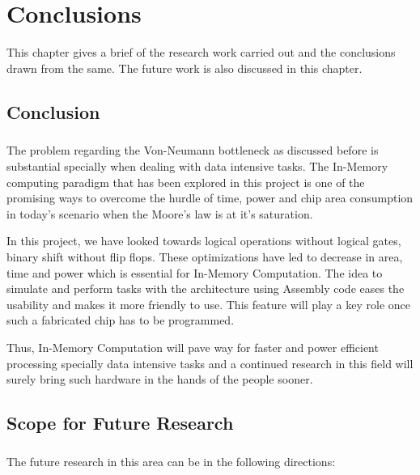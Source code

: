 %
%
\let\textcircled=\pgftextcircled
\chapter{Conclusions}
\label{chap:conclusion}

This chapter gives a brief of the research work carried out and the conclusions drawn from the same. The future work is also discussed in this chapter.

\section{Conclusion}
\paragraph{}

The problem regarding the Von-Neumann bottleneck as discussed before is substantial specially when dealing with data intensive tasks. The In-Memory computing paradigm that has been explored in this project is one of the promising ways to overcome the hurdle of time, power and chip area consumption in today's scenario when the Moore's law is at it's saturation.  

In this project, we have looked towards logical operations without logical gates, binary shift without flip flops. These optimizations have led to decrease in area, time and power which is essential for In-Memory Computation. The idea to simulate and perform tasks with the architecture using Assembly code eases the usability and makes it more friendly to use. This feature will play a key role once such a fabricated chip has to be programmed. 

Thus, In-Memory Computation will pave way for faster and power efficient processing specially data intensive tasks and a continued research in this field will surely bring such hardware in the hands of the people sooner.    

 
\section{Scope for Future Research}
\paragraph{}

The future research in this area can be in the following directions:

